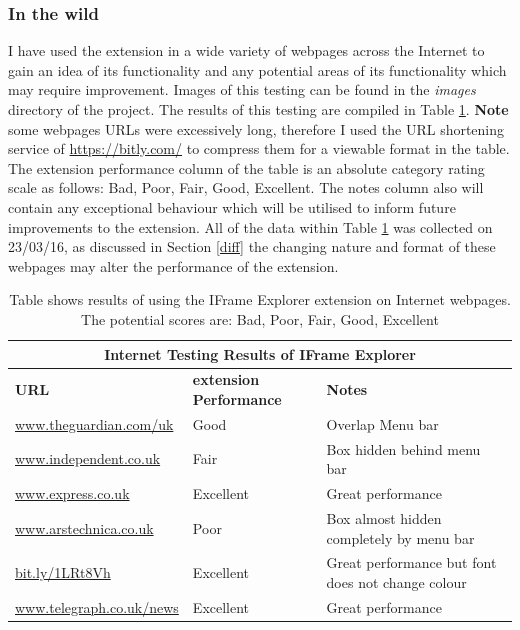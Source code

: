 \documentclass[12pt]{article}
\begin{document}
\subsubsection{In the wild} \label{ieWild}
I have used the extension in a wide variety of webpages across the Internet to gain an idea of its functionality and any potential areas of its functionality which may require improvement. Images of this testing can be found in the \textit{images} directory of the project. The results of this testing are compiled in Table \ref{table:2}. \textbf{Note} some webpages URLs were excessively long, therefore I used the URL shortening service of \url{https://bitly.com/} to compress them for a viewable format in the table. The extension performance column of the table is an absolute category rating scale as follows: Bad, Poor, Fair, Good, Excellent. The notes column also will contain any exceptional behaviour which will be utilised to inform future improvements to the extension. All of the data within Table \ref{table:2} was collected on 23/03/16, as discussed in Section \ref{diff} the changing nature and format of these webpages may alter the performance of the extension. \\

{
\begin{table} [H]
\centering
\begin{tabular}{ |p{5cm}|p{5cm}|p{5cm}|  }
\hline
\multicolumn{3}{|c|}{\textbf{Internet Testing Results of IFrame Explorer}} \\
\hline
\textbf{URL} & \textbf{extension Performance} & \textbf{Notes} \\
\hline
\url{www.theguardian.com/uk} & Good & Overlap Menu bar \\
\hline
\url{www.independent.co.uk} & Fair & Box hidden behind menu bar \\
\hline
\url{www.express.co.uk} & Excellent & Great performance \\
\hline
\url{www.arstechnica.co.uk} & Poor & Box almost hidden completely by menu bar  \\
\hline
\url{bit.ly/1LRt8Vh} & Excellent & Great performance but font does not change colour \\
\hline
\url{www.telegraph.co.uk/news} & Excellent & Great performance   \\
\hline
\end{tabular}
\caption{Table shows results of using the IFrame Explorer extension on Internet webpages. The potential scores are: Bad, Poor, Fair, Good, Excellent}
\label{table:2}
\end{table}
}
\end{document}
